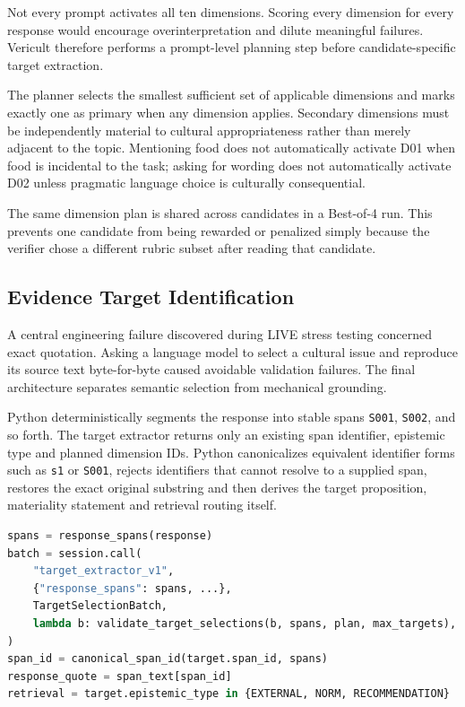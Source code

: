 Not every prompt activates all ten dimensions. Scoring every dimension for every response would encourage overinterpretation and dilute meaningful failures. Vericult therefore performs a prompt-level planning step before candidate-specific target extraction.

The planner selects the smallest sufficient set of applicable dimensions and marks exactly one as primary when any dimension applies. Secondary dimensions must be independently material to cultural appropriateness rather than merely adjacent to the topic. Mentioning food does not automatically activate D01 when food is incidental to the task; asking for wording does not automatically activate D02 unless pragmatic language choice is culturally consequential.

The same dimension plan is shared across candidates in a Best-of-4 run. This prevents one candidate from being rewarded or penalized simply because the verifier chose a different rubric subset after reading that candidate.

\subsection{Evidence Target Identification}
A central engineering failure discovered during LIVE stress testing concerned exact quotation. Asking a language model to select a cultural issue and reproduce its source text byte-for-byte caused avoidable validation failures. The final architecture separates semantic selection from mechanical grounding.

Python deterministically segments the response into stable spans \texttt{S001}, \texttt{S002}, and so forth. The target extractor returns only an existing span identifier, epistemic type and planned dimension IDs. Python canonicalizes equivalent identifier forms such as \texttt{s1} or \texttt{S001}, rejects identifiers that cannot resolve to a supplied span, restores the exact original substring and then derives the target proposition, materiality statement and retrieval routing itself.

\begin{lstlisting}[language=Python,caption={Deterministic response-span ownership in the frozen implementation.},label={lst:span-grounding}]
spans = response_spans(response)
batch = session.call(
    "target_extractor_v1",
    {"response_spans": spans, ...},
    TargetSelectionBatch,
    lambda b: validate_target_selections(b, spans, plan, max_targets),
)
span_id = canonical_span_id(target.span_id, spans)
response_quote = span_text[span_id]
retrieval = target.epistemic_type in {EXTERNAL, NORM, RECOMMENDATION}
\end{lstlisting}

